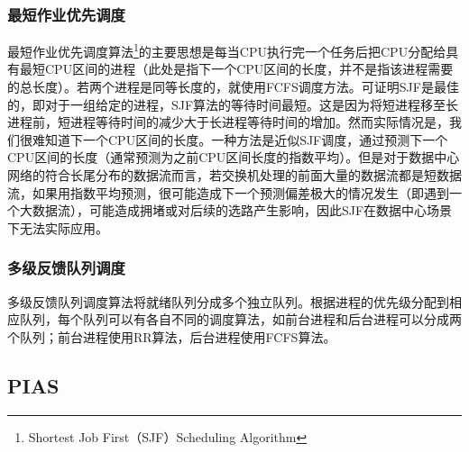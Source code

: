 \subsubsection{最短作业优先调度}
最短作业优先调度算法\footnote{Shortest Job First（SJF）Scheduling Algorithm}的主要思想是每当CPU执行完一个任务后把CPU分配给具有最短CPU区间的进程（此处是指下一个CPU区间的长度，并不是指该进程需要的总长度）。若两个进程是同等长度的，就使用FCFS调度方法。可证明SJF是最佳的，即对于一组给定的进程，SJF算法的等待时间最短。这是因为将短进程移至长进程前，短进程等待时间的减少大于长进程等待时间的增加\cite{OperatingSys}。然而实际情况是，我们很难知道下一个CPU区间的长度。一种方法是近似SJF调度，通过预测下一个CPU区间的长度（通常预测为之前CPU区间长度的指数平均）。但是对于数据中心网络的符合长尾分布的数据流而言，若交换机处理的前面大量的数据流都是短数据流，如果用指数平均预测，很可能造成下一个预测偏差极大的情况发生（即遇到一个大数据流），可能造成拥堵或对后续的选路产生影响，因此SJF在数据中心场景下无法实际应用。
\subsubsection{多级反馈队列调度}
多级反馈队列调度算法将就绪队列分成多个独立队列。根据进程的优先级分配到相应队列，每个队列可以有各自不同的调度算法，如前台进程和后台进程可以分成两个队列；前台进程使用RR算法，后台进程使用FCFS算法。
\subsection{PIAS}


